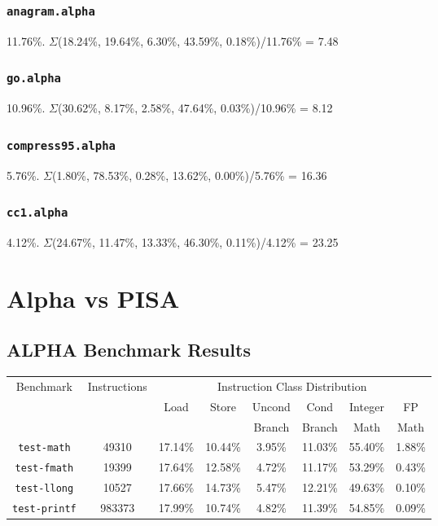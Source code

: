 \documentclass[11pt]{article}
\begin{document}
\subsubsection{\texttt{anagram.alpha}}
\label{sec:orgc38d898}
11.76\%. \(\Sigma\)(18.24\%, 19.64\%, 6.30\%, 43.59\%, 0.18\%)/11.76\% = 7.48
\subsubsection{\texttt{go.alpha}}
\label{sec:org3b97d90}
10.96\%. \(\Sigma\)(30.62\%, 8.17\%, 2.58\%, 47.64\%, 0.03\%)/10.96\% = 8.12
\subsubsection{\texttt{compress95.alpha}}
\label{sec:org112c281}
5.76\%. \(\Sigma\)(1.80\%, 78.53\%, 0.28\%, 13.62\%, 0.00\%)/5.76\% = 16.36
\subsubsection{\texttt{cc1.alpha}}
\label{sec:orgf94a670}
4.12\%. \(\Sigma\)(24.67\%, 11.47\%, 13.33\%, 46.30\%, 0.11\%)/4.12\% = 23.25

\section{Alpha vs PISA}
\label{sec:org2c048d6}
\subsection{ALPHA Benchmark Results}
\label{sec:orgabb86b8}
\begin{center}
\begin{tabular}{|c|c|c|c|c|c|c|c|}
  \hline
  \multirow{3}{*}{Benchmark} & \multirow{3}{*}{Instructions} & \multicolumn{6}{c|}{Instruction Class Distribution} \\ \cline{3-8}
  & & \multirow{2}{*}{Load} & \multirow{2}{*}{Store} & Uncond & Cond   & Integer  & FP\\
  & &                       &                        & Branch & Branch & Math     & Math \\
  \hline
  \texttt{test-math} & 49310 & 17.14\% & 10.44\% & 3.95\% & 11.03\% & 55.40\% & 1.88\% \\
  \texttt{test-fmath} & 19399 & 17.64\% & 12.58\% & 4.72\% & 11.17\% & 53.29\% & 0.43\% \\
  \texttt{test-llong} & 10527 & 17.66\% & 14.73\% & 5.47\% & 12.21\% & 49.63\% & 0.10\% \\
  \texttt{test-printf} & 983373 & 17.99\% & 10.74\% & 4.82\% & 11.39\% & 54.85\% & 0.09\% \\
  \hline
\end{tabular}
\end{center}
\end{document}

